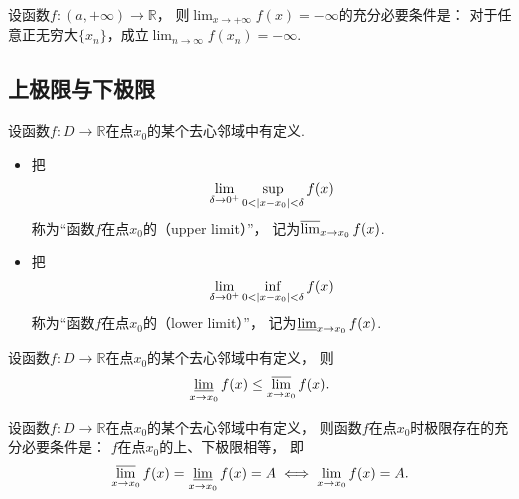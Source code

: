 \begin{theorem}
设函数\(f\colon (a,+\infty)\to\mathbb{R}\)，
则\(\lim_{x\to+\infty} f(x) = -\infty\)的充分必要条件是：
对于任意正无穷大\(\{x_n\}\)，成立\(\lim_{n\to\infty} f(x_n) = -\infty\).
\end{theorem}

\subsection{上极限与下极限}
\begin{definition}
设函数\(f\colon D\to\mathbb{R}\)在点\(x_0\)的某个去心邻域中有定义.
\begin{itemize}
	\item 	把\[
		\lim_{\delta\to0^+} \sup_{0<\abs{x-x_0}<\delta} f(x)
	\]称为“函数\(f\)在点\(x_0\)的（upper limit）”，
	记为\(\varlimsup_{x \to x_0} f(x)\).

	\item 把\[
		\lim_{\delta\to0^+} \inf_{0<\abs{x-x_0}<\delta} f(x)
	\]称为“函数\(f\)在点\(x_0\)的（lower limit）”，
	记为\(\varliminf_{x \to x_0} f(x)\).
\end{itemize}
\end{definition}

\begin{property}
设函数\(f\colon D\to\mathbb{R}\)在点\(x_0\)的某个去心邻域中有定义，
则\[
	\varliminf_{x \to x_0} f(x) \leq \varlimsup_{x \to x_0} f(x).
\]
\end{property}

\begin{theorem}
设函数\(f\colon D\to\mathbb{R}\)在点\(x_0\)的某个去心邻域中有定义，
则函数\(f\)在点\(x_0\)时极限存在的充分必要条件是：
\(f\)在点\(x_0\)的上、下极限相等，
即\[
	\varlimsup_{x \to x_0} f(x)
	= \varliminf_{x \to x_0} f(x)
	= A
	\iff
	\lim_{x \to x_0} f(x) = A.
\]
\end{theorem}
